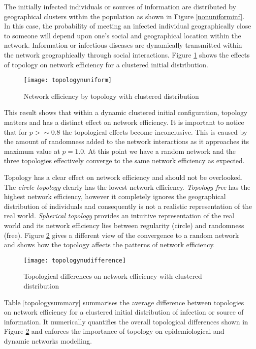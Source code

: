 The initially infected individuals or sources of information are distributed by
geographical clusters within the population as shown in Figure \ref{nonuniforminf}. In
this case, the probability of meeting an infected individual geographically close to
someone will depend upon one's social and geographical location within the network.
Information or infectious diseases are dynamically transmitted within the network
geographically through social interactions. Figure \ref{topologynuniform} shows the
effects of topology on network efficiency for a clustered initial distribution.
\begin{figure}[h]
\texttt{[image: topologynuniform]}
\caption{Network efficiency by topology with clustered distribution}
\label{topologynuniform}
\end{figure}

This result shows that within a dynamic clustered initial configuration, topology matters
and has a distinct effect on network efficiency. It is important to notice that for $p
>\sim 0.8$ the topological effects become inconclusive. This is caused by the amount of
randomness added to the network interactions as it approaches its maximum value at $p =
1.0$. At this point we have a random network and the three topologies effectively
converge to the same network efficiency as expected.

Topology has a clear effect on network efficiency and should not be overlooked. The
\emph{circle topology} clearly has the lowest network efficiency. \emph{Topology free}
has the highest network efficiency, however it completely ignores the geographical
distribution of individuals and consequently is not a realistic representation of the
real world. \emph{Spherical topology} provides an intuitive representation of the real
world and its network efficiency lies between regularity (circle) and randomness (free).
Figure \ref{topologynudifference} gives a different view of the convergence to a random
network and shows how the topology affects the patterns of network efficiency.
\begin{figure}[h]
\begin{center}
\texttt{[image: topologynudifference]}
\caption{Topological differences on network efficiency with clustered distribution}
\label{topologynudifference}
\end{center}
\end{figure}

Table \ref{topologysummary} summarises the average difference between topologies on
network efficiency for a clustered initial distribution of infection or source of
information. It numerically quantifies the overall topological differences shown in
Figure \ref{topologynudifference} and enforces the importance of topology on
epidemiological and dynamic networks modelling.

